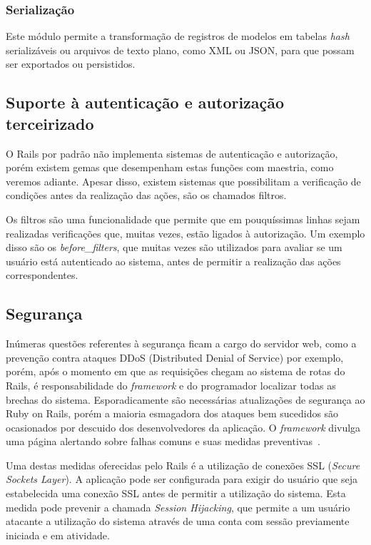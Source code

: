 \subsubsection{Serialização}

Este módulo permite a transformação de registros de modelos em tabelas \textit{hash} serializáveis ou arquivos de texto plano, como XML ou JSON, para que possam ser exportados ou persistidos.

\subsection{Suporte à autenticação e autorização terceirizado}

O Rails por padrão não implementa sistemas de autenticação e autorização, porém existem gemas que desempenham estas funções com maestria, como veremos adiante. Apesar disso, existem sistemas que possibilitam a verificação de condições antes da realização das ações, são os chamados filtros.

Os filtros são uma funcionalidade que permite que em pouquíssimas linhas sejam realizadas verificações que, muitas vezes, estão ligados à autorização. Um exemplo disso são os \textit{before\_filters}, que muitas vezes são utilizados para avaliar se um usuário está autenticado ao sistema, antes de permitir a realização das ações correspondentes.

\subsection{Segurança}

Inúmeras questões referentes à segurança ficam a cargo do servidor web, como a prevenção contra ataques DDoS (Distributed Denial of Service)
por exemplo, porém, após o momento em que as requisições chegam ao sistema de rotas do Rails, é responsabilidade do \textit{framework} e do programador localizar todas as brechas do sistema. Esporadicamente são necessárias atualizações de segurança ao Ruby on Rails, porém a maioria esmagadora dos ataques bem sucedidos são ocasionados por descuido dos desenvolvedores da aplicação. O \textit{framework} divulga uma página alertando sobre falhas comuns e suas medidas preventivas~\cite{segurancarails}.

Uma destas medidas oferecidas pelo Rails é a utilização de conexões SSL (\textit{Secure Sockets Layer}).
A aplicação pode ser configurada para exigir do usuário que seja estabelecida uma conexão SSL antes de permitir a utilização do sistema. Esta medida pode prevenir a chamada \textit{Session Hijacking}, que permite a um usuário atacante a utilização do sistema através de uma conta com sessão previamente iniciada e em atividade.

